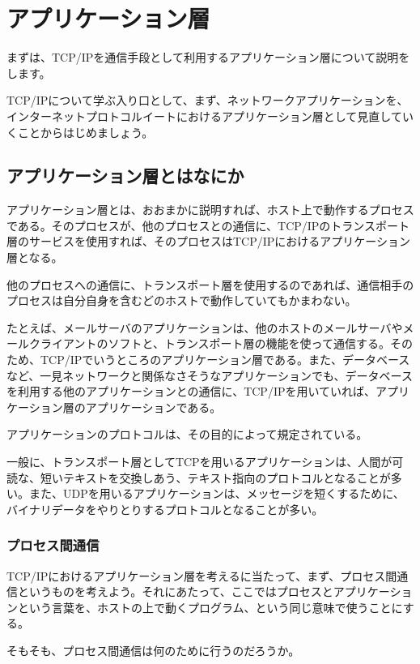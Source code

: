 \chapter{アプリケーション層}



まずは、TCP/IPを通信手段として利用するアプリケーション層について説明をします。

TCP/IPについて学ぶ入り口として、まず、ネットワークアプリケーションを、インターネットプロトコルイートにおけるアプリケーション層として見直していくことからはじめましょう。

\section{アプリケーション層とはなにか}

アプリケーション層とは、おおまかに説明すれば、ホスト上で動作するプロセスである。そのプロセスが、他のプロセスとの通信に、TCP/IPのトランスポート層のサービスを使用すれば、そのプロセスはTCP/IPにおけるアプリケーション層となる。

他のプロセスへの通信に、トランスポート層を使用するのであれば、通信相手のプロセスは自分自身を含むどのホストで動作していてもかまわない。

たとえば、メールサーバのアプリケーションは、他のホストのメールサーバやメールクライアントのソフトと、トランスポート層の機能を使って通信する。そのため、TCP/IPでいうところのアプリケーション層である。また、データベースなど、一見ネットワークと関係なさそうなアプリケーションでも、データベースを利用する他のアプリケーションとの通信に、TCP/IPを用いていれば、アプリケーション層のアプリケーションである。

アプリケーションのプロトコルは、その目的によって規定されている。

一般に、トランスポート層としてTCPを用いるアプリケーションは、人間が可読な、短いテキストを交換しあう、テキスト指向のプロトコルとなることが多い。また、UDPを用いるアプリケーションは、メッセージを短くするために、バイナリデータをやりとりするプロトコルとなることが多い。

\subsection{プロセス間通信}
TCP/IPにおけるアプリケーション層を考えるに当たって、まず、プロセス間通信というものを考えよう。それにあたって、ここではプロセスとアプリケーションという言葉を、ホストの上で動くプログラム、という同じ意味で使うことにする。

そもそも、プロセス間通信は何のために行うのだろうか。


